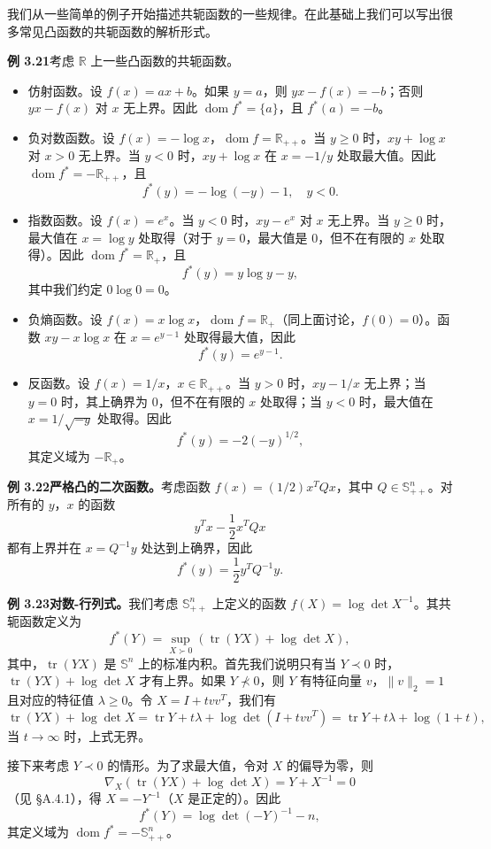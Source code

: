 \documentclass[UTF8, 12pt, fontset=fandol, oneside]{ctexart}
\DeclareMathOperator{\dom}{dom}
\begin{document}
我们从一些简单的例子开始描述共轭函数的一些规律。在此基础上我们可以写出很多常见凸函数的共轭函数的解析形式。

\noindent\textbf{例 3.21}\quad 考虑 $\mathbb{R}$ 上一些凸函数的共轭函数。
\begin{itemize}
\item 仿射函数。设 $f(x)=ax+b$。如果 $y=a$，则 $yx-f(x)=-b$；否则 $yx-f(x)$ 对 $x$ 无上界。因此 $\dom f^*=\{a\}$，且 $f^*(a)=-b$。
\item 负对数函数。设 $f(x)=-\log x$，$\dom f=\mathbb{R}_{++}$。当 $y\geq0$ 时，$xy+\log x$ 对 $x>0$ 无上界。当 $y<0$ 时，$xy+\log x$ 在 $x=-1/y$ 处取最大值。因此 $\dom f^*=-\mathbb{R}_{++}$，且
\[
f^*(y)=-\log(-y)-1,\quad y<0.
\]
\item 指数函数。设 $f(x)=e^x$。当 $y<0$ 时，$xy-e^x$ 对 $x$ 无上界。当 $y\geq0$ 时，最大值在 $x=\log y$ 处取得（对于 $y=0$，最大值是 $0$，但不在有限的 $x$ 处取得）。因此 $\dom f^*=\mathbb{R}_+$，且
\[
f^*(y)=y\log y-y,
\]
其中我们约定 $0\log0=0$。
\item 负熵函数。设 $f(x)=x\log x$，$\dom f=\mathbb{R}_+$（同上面讨论，$f(0)=0$）。函数 $xy-x\log x$ 在 $x=e^{y-1}$ 处取得最大值，因此
\[
f^*(y)=e^{y-1}.
\]
\item 反函数。设 $f(x)=1/x$，$x\in\mathbb{R}_{++}$。当 $y>0$ 时，$xy-1/x$ 无上界；当 $y=0$ 时，其上确界为 $0$，但不在有限的 $x$ 处取得；当 $y<0$ 时，最大值在 $x=1/\sqrt{-y}$ 处取得。因此
\[
f^*(y)=-2(-y)^{1/2},
\]
其定义域为 $-\mathbb{R}_+$。
\end{itemize}

\noindent\textbf{例 3.22\quad 严格凸的二次函数。}\quad 考虑函数 $f(x)=(1/2)x^TQx$，其中 $Q\in\mathbb{S}_{++}^n$。对所有的 $y$，$x$ 的函数
\[
y^Tx-\frac{1}{2}x^TQx
\]
都有上界并在 $x=Q^{-1}y$ 处达到上确界，因此
\[
f^*(y)=\frac{1}{2}y^TQ^{-1}y.
\]

\noindent\textbf{例 3.23\quad 对数-行列式。}\quad 我们考虑 $\mathbb{S}_{++}^n$ 上定义的函数 $f(X)=\log\det X^{-1}$。其共轭函数定义为
\[
f^*(Y)=\sup_{X\succ0}\left(\operatorname{tr}(YX)+\log\det X\right),
\]
其中，$\operatorname{tr}(YX)$ 是 $\mathbb{S}^n$ 上的标准内积。首先我们说明只有当 $Y\prec0$ 时，$\operatorname{tr}(YX)+\log\det X$ 才有上界。如果 $Y\nprec0$，则 $Y$ 有特征向量 $v$，$\|v\|_2=1$ 且对应的特征值 $\lambda\geq0$。令 $X=I+tvv^T$，我们有
\[
\operatorname{tr}(YX)+\log\det X
=\operatorname{tr}Y+t\lambda+\log\det(I+tvv^T)
=\operatorname{tr}Y+t\lambda+\log(1+t),
\]
当 $t\to\infty$ 时，上式无界。

接下来考虑 $Y\prec0$ 的情形。为了求最大值，令对 $X$ 的偏导为零，则
\[
\nabla_X\left(\operatorname{tr}(YX)+\log\det X\right)=Y+X^{-1}=0
\]
（见 \S A.4.1），得 $X=-Y^{-1}$（$X$ 是正定的）。因此
\[
f^*(Y)=\log\det(-Y)^{-1}-n,
\]
其定义域为 $\dom f^*=-\mathbb{S}_{++}^n$。
\end{document}
